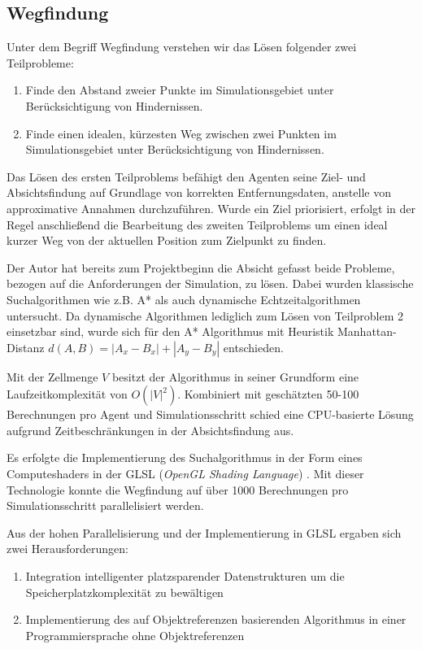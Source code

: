 \documentclass[runningheads]{llncs}
\begin{document}
\subsection{Wegfindung}\label{wegfindung}
Unter dem Begriff Wegfindung verstehen wir das Lösen folgender zwei Teilprobleme:
\begin{enumerate}
\item Finde den Abstand zweier Punkte im Simulationsgebiet unter Berücksichtigung von Hindernissen.
\item Finde einen idealen, kürzesten Weg zwischen zwei Punkten im Simulationsgebiet unter Berücksichtigung von Hindernissen.
\end{enumerate}
Das Lösen des ersten Teilproblems befähigt den Agenten seine Ziel- und Absichtsfindung auf Grundlage von korrekten Entfernungsdaten, anstelle von approximative Annahmen durchzuführen.
Wurde ein Ziel priorisiert, erfolgt in der Regel anschließend die Bearbeitung des zweiten Teilproblems um einen ideal kurzer Weg von der aktuellen Position zum Zielpunkt zu finden.

Der Autor hat bereits zum Projektbeginn die Absicht gefasst beide Probleme, bezogen auf die Anforderungen der Simulation, zu lösen. Dabei wurden klassische Suchalgorithmen wie z.B. A* \cite{Hart1968} als auch dynamische Echtzeitalgorithmen \cite[182-191]{Weiss2000} untersucht. Da dynamische Algorithmen lediglich zum Lösen von Teilproblem 2 einsetzbar sind, wurde sich für den A* Algorithmus mit Heuristik Manhattan-Distanz $d(A, B) = | A_{x} - B_{x} | + | A_{y} - B_{y} |$ entschieden.

Mit der Zellmenge $V$ besitzt der Algorithmus in seiner Grundform eine Laufzeitkomplexität von $O(|V|^{2})$. Kombiniert mit geschätzten 50-100 Berechnungen pro Agent und Simulationsschritt schied eine CPU-basierte Lösung aufgrund Zeitbeschränkungen in der Absichtsfindung aus.

Es erfolgte die Implementierung des Suchalgorithmus in der Form eines Computeshaders in der GLSL (\textit{OpenGL Shading Language}) \cite{GLSL}. Mit dieser Technologie konnte die Wegfindung auf über 1000 Berechnungen pro Simulationsschritt parallelisiert werden.

Aus der hohen Parallelisierung und der Implementierung in GLSL ergaben sich zwei Herausforderungen:
\begin{enumerate}
\item Integration intelligenter platzsparender Datenstrukturen um die Speicherplatzkomplexität zu bewältigen
\item Implementierung des auf Objektreferenzen basierenden Algorithmus in einer Programmiersprache ohne Objektreferenzen
\end{enumerate}
\end{document}
